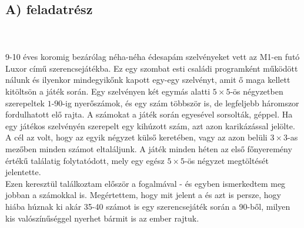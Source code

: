 \section{}
\subsection*{A) feladatrész}
\\ \\
9-10 éves koromig bezárólag néha-néha édesapám szelvényeket vett az M1-en futó Luxor című szerencsejátékba. Ez egy szombat esti családi programként működött nálunk és ilyenkor mindegyikőnk kapott egy-egy szelvényt, amit ő maga kellett kitöltsön a játék során. Egy szelvényen két egymás alatti $5 \times 5$-ös négyzetben szerepeltek $1$-$90$-ig nyerőszámok, és egy szám többször is, de legfeljebb háromszor fordulhatott elő rajta. A számokat a játék során egyesével sorsolták, géppel. Ha egy játékos szelvényén szerepelt egy kihúzott szám, azt azon karikázással jelölte. A cél az volt, hogy az egyik négyzet külső keretében, vagy az azon belüli $3 \times 3$-as mezőben minden számot eltaláljunk. A játék minden héten az első főnyeremény értékű találatig folytatódott, mely egy egész $5 \times 5$-ös négyzet megtöltését jelentette. \\
Ezen keresztül találkoztam először a  fogalmával - és egyben ismerkedtem meg jobban a számokkal is. Megértettem, hogy mit jelent a  és azt is persze, hogy hiába húznak ki akár 35-40 számot is egy szerencsejáték során a 90-ből, milyen kis valószínűséggel nyerhet bármit is az ember rajtuk.

